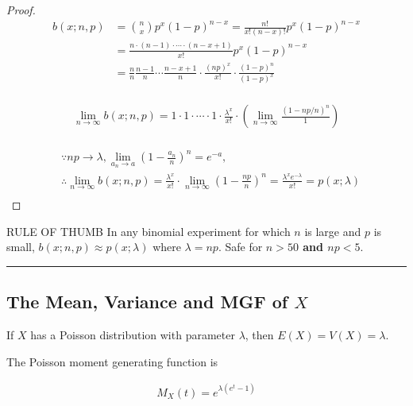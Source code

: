 \begin{proof}
    \begin{align*}
        b(x;n,p) & = {n\choose x} p^x (1-p)^{n-x} = \frac{n!}{x!(n-x)!} p^x (1-p)^{n-x} \\
        & = \frac{n\cdot (n-1) \cdot \cdots \cdot (n-x+1)}{x!} p^x (1-p)^{n-x}\\
        & = \frac{n}{n} \frac{n-1}{n}\cdots \frac{n-x+1}{n}\cdot\frac{(np)^x}{x!}\cdot\frac{(1-p)^n}{(1-p)^x} \\
    \end{align*}
    
    \begin{align*}
        \lim\limits_{n\rightarrow\infty}b(x;n,p) = 1\cdot 1 \cdot \cdots \cdot 1 \cdot \frac{\lambda^x}{x!}\cdot\left(\lim\limits_{n\rightarrow\infty}\frac{(1-np/n)^n}{1}\right) \\
    \end{align*}
    
    \begin{align*}
        & \because np\rightarrow\lambda, \lim\limits_{a_n\rightarrow a}\left(1-\frac{a_n}{n}\right)^n=e^{-a}, \\
        & \therefore \lim\limits_{n\rightarrow\infty}b(x;n,p) = \frac{\lambda^x}{x!}\cdot\lim\limits_{n\rightarrow\infty}\left(1-\frac{np}{n}\right)^n = \frac{\lambda^xe^{-\lambda}}{x!} = p(x;\lambda) \\
    \end{align*}
\end{proof}

\begin{theorem}{RULE OF THUMB}
    In any binomial experiment for which $n$ is large and $p$ is small, $b(x;n,p)\approx p(x;\lambda)$ where $\lambda = np$. Safe for \textbf{$n > 50$ and $np < 5$}.
\end{theorem}

\noindent\rule{\textwidth}{1pt}

\subsection{The Mean, Variance and MGF of $X$}

\begin{proposition}
    If $X$ has a Poisson distribution with parameter $\lambda$, then $E(X) = V(X) = \lambda$.
\end{proposition}

\begin{proposition}
    The Poisson moment generating function is 

    \begin{align*}
        M_X(t) = e^{\lambda(e^t-1)}
    \end{align*}
\end{proposition}

